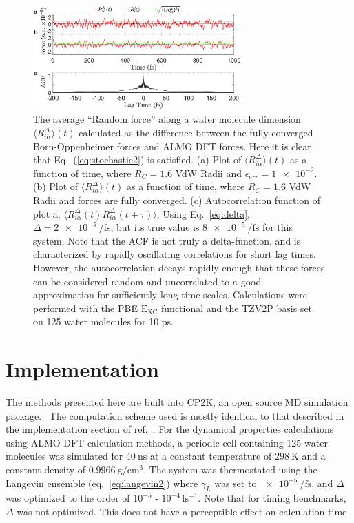 \documentclass[10pt,aps,prl,twocolumn,amsmath,amssymb,superscriptaddress,longbibliography]{revtex4-1}
\begin{document}
\begin{figure}
\includegraphics[trim={0.5cm 0.7cm 0.5cm 0cm},clip,width=8cm]{DeltaForceComparison_with_ACF.eps}
\caption{\label{fig:randomforce}The average ``Random force'' along a water molecule dimension $\langle R^{\Delta}_{i\alpha} \rangle (t)$ calculated as the difference between the fully converged Born-Oppenheimer forces and ALMO DFT forces. Here it is clear that Eq.\ (\ref{eq:stochastic2}) is satisfied. 
(a) Plot of $\langle R^{\Delta}_{i\alpha} \rangle (t)$ as a function of time, where $R_{C} = 1.6$ VdW Radii and $\epsilon_{err} = \num{1e-2}$.
(b) Plot of $\langle R^{\Delta}_{i\alpha} \rangle (t)$ as a function of time, where $R_{C} = 1.6$ VdW Radii and forces are fully converged.
(c) Autocorrelation function of plot a, $\langle R^{\Delta}_{i\alpha} (t) R^{\Delta}_{i\alpha} (t+\tau) \rangle $.
Using Eq.\ \ref{eq:delta}, $\Delta = \SI{2e-5}{\per\fs}$, but its true value is $\SI{8e-5}{\per\fs}$ for this system.
Note that the  ACF is not truly a delta-function, and is characterized by rapidly oscillating correlations for short lag times. 
However, the autocorrelation decays rapidly enough that these forces can be considered random and uncorrelated to a good approximation for sufficiently long time scales. 
Calculations were performed with the PBE $\mathrm{E_{XC}}$ functional and the TZV2P basis set on 125 water molecules for 10 ps.}
\end{figure}

\section{Implementation}

The methods presented here are built into CP2K, an open source MD simulation package.~\cite{www:cp2k} 
The computation scheme used is mostly identical to that described in the implementation section of ref.\ . 
For the dynamical properties calculations using ALMO DFT calculation methods, a periodic cell containing 125 water molecules was simulated for $\SI{40}{\ns}$ at a constant temperature of $\SI{298}{\K}$ and a constant density of $\SI{0.9966}{\g\per\cm^{3}}$. 
The system was thermostated using the Langevin ensemble (eq.\ \ref{eq:langevin2}) where $\gamma_L$ was set to $\SI{e-5}{\per\fs}$, and $\Delta$ was optimized to the order of $10^{-5}$ - $10^{-4}\, \mathrm{fs^{-1}}$. 
Note that for timing benchmarks, $\Delta$ was not optimized. 
This does not have a perceptible effect on calculation time.
\end{document}
